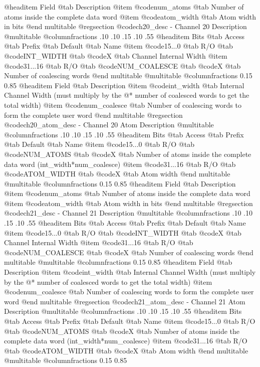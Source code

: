 @headitem Field @tab Description
@item @code{num_atoms} @tab Number of atoms inside the complete data word
@item @code{atom_width} @tab Atom width in bits
@end multitable
@regsection @code{ch20_desc} - Channel 20 Description
@multitable @columnfractions .10 .10 .15 .10 .55
@headitem Bits @tab Access @tab Prefix @tab Default @tab Name
@item @code{15...0}
@tab R/O @tab
@code{INT_WIDTH}
@tab @code{X} @tab 
Channel Internal Width
@item @code{31...16}
@tab R/O @tab
@code{NUM_COALESCE}
@tab @code{X} @tab 
Number of coalescing words
@end multitable
@multitable @columnfractions 0.15 0.85
@headitem Field @tab Description
@item @code{int_width} @tab Internal Channel Width (must multiply by the @* number of coalesced words to get the total width)
@item @code{num_coalesce} @tab Number of coalescing words to form the complete user word
@end multitable
@regsection @code{ch20_atom_desc} - Channel 20 Atom Description
@multitable @columnfractions .10 .10 .15 .10 .55
@headitem Bits @tab Access @tab Prefix @tab Default @tab Name
@item @code{15...0}
@tab R/O @tab
@code{NUM_ATOMS}
@tab @code{X} @tab 
Number of atoms inside the complete data word (int_width*num_coalesce)
@item @code{31...16}
@tab R/O @tab
@code{ATOM_WIDTH}
@tab @code{X} @tab 
Atom width
@end multitable
@multitable @columnfractions 0.15 0.85
@headitem Field @tab Description
@item @code{num_atoms} @tab Number of atoms inside the complete data word
@item @code{atom_width} @tab Atom width in bits
@end multitable
@regsection @code{ch21_desc} - Channel 21 Description
@multitable @columnfractions .10 .10 .15 .10 .55
@headitem Bits @tab Access @tab Prefix @tab Default @tab Name
@item @code{15...0}
@tab R/O @tab
@code{INT_WIDTH}
@tab @code{X} @tab 
Channel Internal Width
@item @code{31...16}
@tab R/O @tab
@code{NUM_COALESCE}
@tab @code{X} @tab 
Number of coalescing words
@end multitable
@multitable @columnfractions 0.15 0.85
@headitem Field @tab Description
@item @code{int_width} @tab Internal Channel Width (must multiply by the @* number of coalesced words to get the total width)
@item @code{num_coalesce} @tab Number of coalescing words to form the complete user word
@end multitable
@regsection @code{ch21_atom_desc} - Channel 21 Atom Description
@multitable @columnfractions .10 .10 .15 .10 .55
@headitem Bits @tab Access @tab Prefix @tab Default @tab Name
@item @code{15...0}
@tab R/O @tab
@code{NUM_ATOMS}
@tab @code{X} @tab 
Number of atoms inside the complete data word (int_width*num_coalesce)
@item @code{31...16}
@tab R/O @tab
@code{ATOM_WIDTH}
@tab @code{X} @tab 
Atom width
@end multitable
@multitable @columnfractions 0.15 0.85
